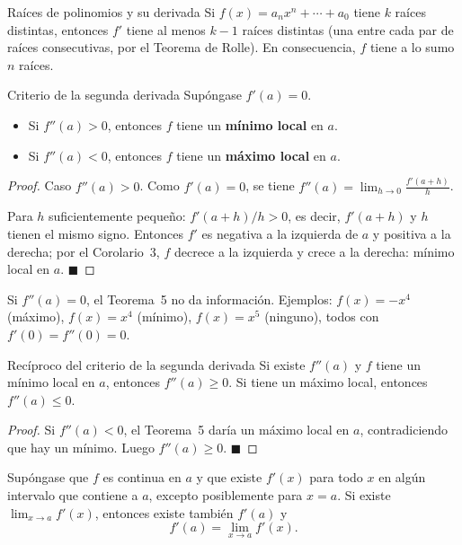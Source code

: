 \documentclass[12pt]{article}
\begin{document}
\begin{nota}[]{Raíces de polinomios y su derivada}
Si $f(x) = a_n x^n + \cdots + a_0$ tiene $k$ raíces distintas, entonces $f'$ tiene al menos $k-1$ raíces distintas (una entre cada par de raíces consecutivas, por el Teorema de Rolle). En consecuencia, $f$ tiene a lo sumo $n$ raíces.
\end{nota}

\begin{teorema}[5]{Criterio de la segunda derivada}
Supóngase $f'(a) = 0$.
\begin{itemize}
  \item Si $f''(a) > 0$, entonces $f$ tiene un \textbf{mínimo local} en $a$.
  \item Si $f''(a) < 0$, entonces $f$ tiene un \textbf{máximo local} en $a$.
\end{itemize}
\end{teorema}

\begin{proof}
Caso $f''(a) > 0$. Como $f'(a) = 0$, se tiene $f''(a) = \displaystyle\lim_{h\to 0}\frac{f'(a+h)}{h}$.

Para $h$ suficientemente pequeño:
$f'(a+h)/h > 0$, es decir, $f'(a+h)$ y $h$ tienen el mismo signo. Entonces $f'$ es negativa a la izquierda de $a$ y positiva a la derecha; por el Corolario~3, $f$ decrece a la izquierda y crece a la derecha: mínimo local en $a$.
$\blacksquare$
\end{proof}

\begin{nota}[]{}
Si $f''(a) = 0$, el Teorema~5 no da información. Ejemplos: $f(x) = -x^4$ (máximo), $f(x) = x^4$ (mínimo), $f(x) = x^5$ (ninguno), todos con $f'(0) = f''(0) = 0$.
\end{nota}

\begin{teorema}[6]{Recíproco del criterio de la segunda derivada}
Si existe $f''(a)$ y $f$ tiene un mínimo local en $a$, entonces $f''(a) \geq 0$. Si tiene un máximo local, entonces $f''(a) \leq 0$.
\end{teorema}

\begin{proof}
Si $f''(a) < 0$, el Teorema~5 daría un máximo local en $a$, contradiciendo que hay un mínimo. Luego $f''(a) \geq 0$.
$\blacksquare$
\end{proof}

\begin{teorema}[7]{}
Supóngase que $f$ es continua en $a$ y que existe $f'(x)$ para todo $x$ en algún intervalo que contiene a $a$, excepto posiblemente para $x = a$. Si existe $\displaystyle\lim_{x \to a} f'(x)$, entonces existe también $f'(a)$ y
\[ f'(a) = \lim_{x \to a} f'(x). \]
\end{teorema}
\end{document}
